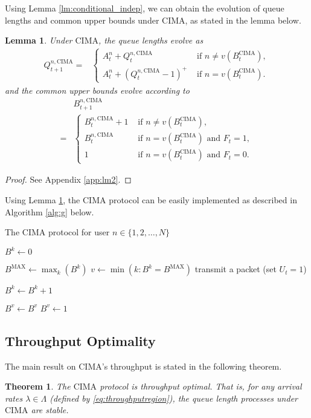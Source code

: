 \documentclass[onecolumn,draftcls]{IEEEtran}
\newtheorem{theorem}{Theorem}
\newtheorem{lemma}{Lemma}
\newcommand{\g}{\text{CIMA}}
\begin{document}
Using Lemma \ref{lm:conditional_indep}, we can obtain the evolution of queue lengths and common upper bounds under $\g$, as stated in the lemma below.
\begin{lemma}
\label{lm:evolution}
Under $\g$, the queue lengths evolve as
\begin{align}
Q^{n,\g}_{t+1}
 = & \left\{ \begin{array}{ll}
      A^n_t+Q^{n,\g}_{t} & \text{ if } n \neq v(B^{\g}_t) ,\\ 
      A^n_t+\left(Q^{n,\g}_{t} - 1\right)^+ & \text{ if } n = v(B^{\g}_t).
      \end{array}\right.
\label{eq:Qunderg}
\end{align}
and the common upper bounds evolve according to
\begin{align}
&B^{n,\g}_{t+1}\nonumber\\
 = & \left\{ \begin{array}{ll}
      B^{n,\g}_{t}+1 & \text{ if } n \neq v(B^{\g}_t), \\ 
      B^{n,\g}_{t}   & \text{ if } n  = v(B^{\g}_t) \text{ and } F_t=1, \\
      1   & \text{ if } n = v(B^{\g}_t) \text{ and } F_t =0 .
      \end{array}\right.
\label{eq:Bunderg}
\end{align}
\end{lemma}
\begin{proof}
See Appendix \ref{app:lm2}.
\end{proof}
Using Lemma \ref{lm:evolution},
the $\g$ protocol can be easily implemented as described in Algorithm \ref{alg:g} below.
\begin{algorithm}[H]
\caption{The $\g$ protocol for user $n \in\{1,2,\dots,N\}$}
\label{alg:g}
\begin{algorithmic}
\STATE $B^k \leftarrow 0$
\ENDFOR

\STATE $B^{\text{MAX}} \leftarrow \max_k(B^k)$
\STATE $v \leftarrow \min(k: B^k = B^{\text{MAX}})$
\STATE transmit a packet (set $U_t = 1$)
\ENDIF


\STATE $B^k \leftarrow B^k+1$
\ENDFOR

\STATE  $B^v \leftarrow B^v$
\ELSE
\STATE  $B^v \leftarrow 1$
\ENDIF
\ENDWHILE
\end{algorithmic}
\end{algorithm}

\subsection{Throughput Optimality} \label{sub:throughput}
The main result on $\g$'s throughput is stated in the following theorem.
\begin{theorem}
\label{thm:throughput_optimal}
The $\g$ protocol is throughput optimal.
That is, for any arrival rates $\lambda \in \Lambda$ (defined by \eqref{eq:throughputregion}),
the queue length processes under $\g$ are stable.
\end{theorem}
\end{document}
